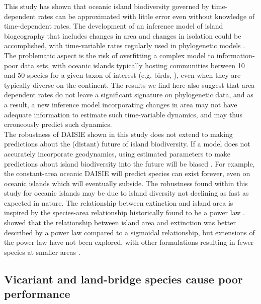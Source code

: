 \documentclass{article}
\begin{document}
This study has shown that oceanic island biodiversity governed by time-dependent rates can be approximated with little error even without knowledge of time-dependent rates. The development of an inference model of island biogeography that includes changes in area and changes in isolation could be accomplished, with time-variable rates regularly used in phylogenetic models \citep{condamine_assessing_2019}. The problematic aspect is the risk of overfitting a complex model to information-poor data sets, with oceanic islands typically hosting communities between 10 and 50 species for a given taxon of interest (e.g. birds, \cite{valente_simple_2020}), even when they are typically diverse on the continent. The results we find here also suggest that area-dependent rates do not leave a significant signature on phylogenetic data, and as a result, a new inference model incorporating changes in area may not have adequate information to estimate such time-variable dynamics, and may thus erroneously predict such dynamics. \\

The robustness of DAISIE shown in this study does not extend to making predictions about the (distant) future of island biodiversity. If a model does not accurately incorporate geodynamics, using estimated parameters to make predictions about island biodiversity into the future will be biased \citep{valente_recent_2017}. For example, the constant-area oceanic DAISIE will predict species can exist forever, even on oceanic islands which will eventually subside. The robustness found within this study for oceanic islands may be due to island diversity not declining as fast as expected in nature. The relationship between extinction and island area is inspired by the species-area relationship historically found to be a power law \citep{dengler_which_2009}. \cite{valente_simple_2020} showed that the relationship between island area and extinction was better described by a power law compared to a sigmoidal relationship, but extensions of the power law have not been explored, with other formulations resulting in fewer species at smaller areas \citep{plotkin_predicting_2000}. 

\subsection*{Vicariant and land-bridge species cause poor performance}
\end{document}
